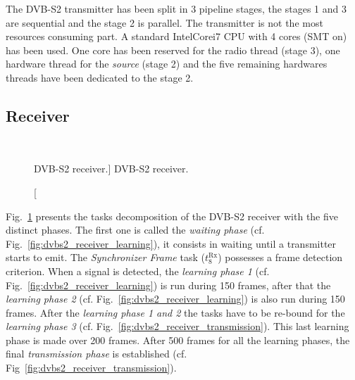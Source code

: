 The DVB-S2 transmitter has been split in 3 pipeline stages, the stages 1 and 3
are sequential and the stage 2 is parallel. The transmitter is not the most
resources consuming part. A standard Intel\R Core\TM i7 CPU with 4 cores (SMT
on) has been used. One core has been reserved for the radio thread (stage 3),
one hardware thread for the \emph{source} (stage 2) and the five
remaining hardwares threads have been dedicated to the stage 2.

\subsection{Receiver}

\begin{figure}[htp]
  \centering
  \\
  \caption
    [DVB-S2 receiver.]
    {DVB-S2 receiver.}
  \label{fig:dvbs2_receiver}
\end{figure}

Fig.~\ref{fig:dvbs2_receiver} presents the tasks decomposition of the DVB-S2
receiver with the five distinct phases. The first one is called the
\emph{waiting phase} (cf. Fig.~\ref{fig:dvbs2_receiver_learning}), it consists
in waiting until a transmitter starts to emit. The \emph{Synchronizer
Frame} task ($t^\text{Rx}_8$) possesses a frame detection criterion. When a
signal is detected, the \emph{learning phase 1} (cf.
Fig.~\ref{fig:dvbs2_receiver_learning}) is run during 150 frames, after that the
\emph{learning phase 2} (cf. Fig.~\ref{fig:dvbs2_receiver_learning}) is also run
during 150 frames. After the \emph{learning phase 1 and 2} the tasks have to be
re-bound for the \emph{learning phase 3}
(cf. Fig.~\ref{fig:dvbs2_receiver_transmission}). This last learning phase is
made over 200 frames. After 500 frames for all the learning phases, the final
\emph{transmission phase} is established (cf.
Fig~\ref{fig:dvbs2_receiver_transmission}).


